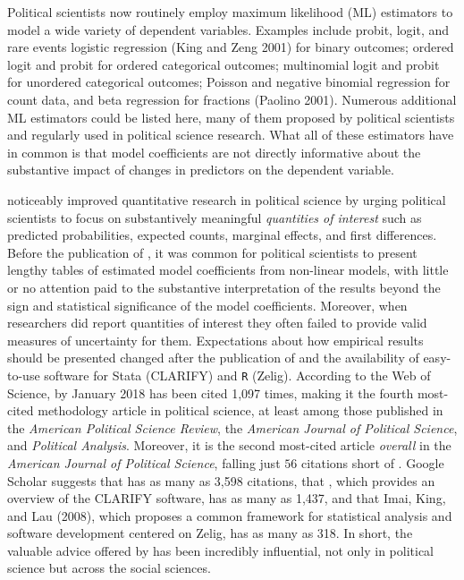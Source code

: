 \documentclass[11pt]{article}
\begin{document}
\thispagestyle{empty}

\onehalfspace

Political scientists now routinely employ maximum likelihood (ML) estimators to model a wide variety of dependent variables. Examples include probit, logit, and rare events logistic regression (King and Zeng 2001) for binary outcomes; ordered logit and probit for ordered categorical outcomes; multinomial logit and probit for unordered categorical outcomes; Poisson and negative binomial regression for count data, and beta regression for fractions (Paolino 2001). Numerous additional ML estimators could be listed here, many of them proposed by political scientists and regularly used in political science research. What all of these estimators have in common is that model coefficients are not directly informative about the substantive impact of changes in predictors on the dependent variable.

\cite{KingTomzWittenberg2000} noticeably improved quantitative research in political science by urging political scientists to focus on substantively meaningful {\it quantities of interest} such as predicted probabilities, expected counts, marginal effects, and first differences. Before the publication of \cite{KingTomzWittenberg2000}, it was common for political scientists to present lengthy tables of estimated model coefficients from non-linear models, with little or no attention paid to the substantive interpretation of the results beyond the sign and statistical significance of the model coefficients. Moreover, when researchers did report quantities of interest they often failed to provide valid measures of uncertainty for them. Expectations about how empirical results should be presented changed after the publication of \cite{KingTomzWittenberg2000} and the availability of easy-to-use software for Stata (CLARIFY) and \texttt{R} (Zelig). According to the Web of Science, by January 2018 \cite{KingTomzWittenberg2000} has been cited 1,097 times, making it the fourth most-cited methodology article in political science, at least among those published in the \textit{American Political Science Review}, the \textit{American Journal of Political Science}, and \textit{Political Analysis}. Moreover, it is the second most-cited article \textit{overall} in the \textit{American Journal of Political Science}, falling just $56$ citations short of \cite{BeckKatzTucker1998}. Google Scholar suggests that \cite{KingTomzWittenberg2000} has as many as 3,598 citations, that \cite{TomzWittenbergKing2003}, which provides an overview of the CLARIFY software, has as many as 1,437, and that Imai, King, and Lau (2008), which proposes a common framework for statistical analysis and software development centered on Zelig, has as many as 318. In short, the valuable advice offered by \cite{KingTomzWittenberg2000} has been incredibly influential, not only in political science but across the social sciences.
\end{document}
